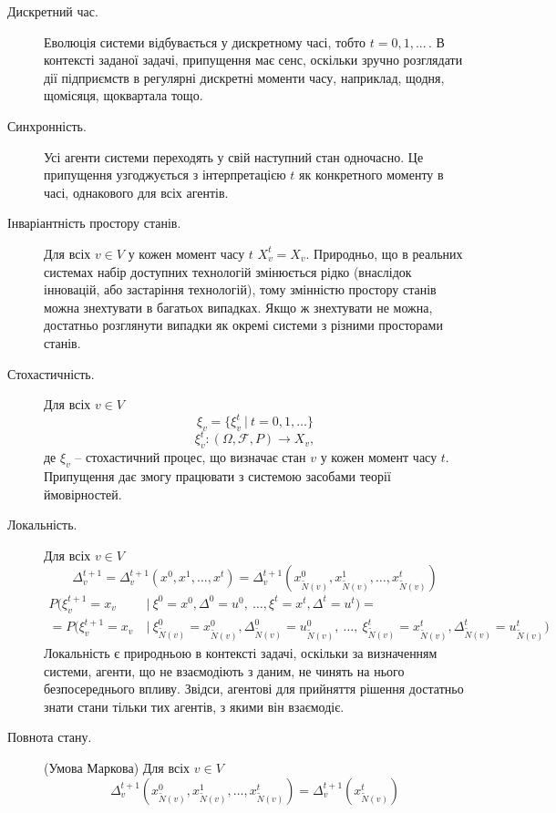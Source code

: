 \documentclass[oneside,draft,14pt]{extarticle}
\begin{document}
\begin{description} 
    \item[Дискретний час.] Еволюція системи відбувається у дискретному часі, тобто \(t = 0, 1, ...\,\). В контексті заданої задачі, припущення має сенс, оскільки зручно розглядати дії підприємств в регулярні дискретні моменти часу, наприклад, щодня, щомісяця, щоквартала тощо.
    \item[Синхронність.] Усі агенти системи переходять у свій наступний стан одночасно. Це припущення узгоджується з інтерпретацією \(t\) як конкретного моменту в часі, однакового для всіх агентів.
    \item[Інваріантність простору станів.] Для всіх \(v \in V\) у кожен момент часу \(t\) \(X_v^t = X_v\). Природньо, що в реальних системах набір доступних технологій змінюється рідко (внаслідок інновацій, або застаріння технологій), тому змінністю простору станів можна знехтувати в багатьох випадках. Якщо ж знехтувати не можна, достатньо розглянути випадки як окремі системи з різними просторами станів.
    \item[Стохастичність.] Для всіх \(v \in V\)
    \[ \xi_v = \{\xi^t_v\ |\ t = 0, 1, \ldots \}\] \[ \xi_v^t : (\Omega, \mathcal{F}, P) \rightarrow X_v,\]
    де \( \xi_v \) – стохастичний процес, що визначає стан \(v\) у кожен момент часу \(t\). Припущення дає змогу працювати з системою засобами теорії ймовірностей.
    \item[Локальність.] Для всіх \(v \in V\) 
    \[\Delta_v^{t+1} = \Delta_v^{t+1}(x^0, x^1, \ldots, x^t) = \Delta_v^{t+1}(x_{\tilde{N}(v)}^0, x_{\tilde{N}(v)}^1, \ldots, x_{\tilde{N}(v)}^t)\]
    \begin{align*}
    P(\xi_v^{t+1} = x_v\ &|\ \xi^0 = x^0, \Delta^0 = u^0,\ \ldots, \xi^t = x^t, \Delta^t = u^t) = \\
	= P(\xi_v^{t+1} = x_v\ &|\ \xi_{\tilde N(v)}^0 = x_{\tilde N(v)}^0, \Delta_{\tilde N(v)}^0 = u_{\tilde N(v)}^0,\ \ldots,\ \xi_{\tilde N(v)}^t = x_{\tilde N(v)}^t, \Delta_{\tilde N(v)}^t = u_{\tilde N(v)}^t)
	\end{align*}
	Локальність є природньою в контексті задачі, оскільки за визначенням системи, агенти, що не взаємодіють з даним, не чинять на нього безпосереднього впливу. Звідси, агентові для прийняття рішення достатньо знати стани тільки тих агентів, з якими він взаємодіє.
	\item[Повнота стану.] (Умова Маркова) Для всіх \(v \in V\)
	\[\Delta_v^{t+1}(x_{\tilde{N}(v)}^0, x_{\tilde{N}(v)}^1, \ldots, x_{\tilde{N}(v)}^t) = \Delta_v^{t+1}(x_{\tilde{N}(v)}^t)\]

\end{description}
\end{document}
